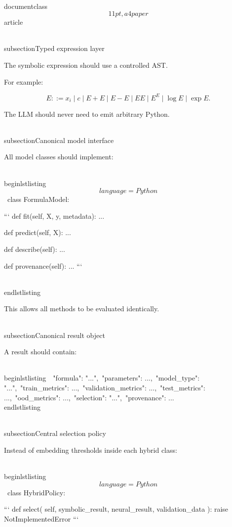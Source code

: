 \\documentclass\[11pt,a4paper\]{article}
\begin{document}
 \\subsection{Typed expression layer}

 The symbolic expression should use a controlled AST.

 For example:

 $$
E::=
x_i
\mid
c
\mid
E+E
\mid
E-E
\mid
E E
\mid
E^E
\mid
\log E
\mid
\exp E.
$$

 The LLM should never need to emit arbitrary Python.

 \\subsection{Canonical model interface}

 All model classes should implement:

 \\begin{lstlisting}\[language=Python\]\
 class FormulaModel:

```
def fit(self, X, y, metadata):
    ...

def predict(self, X):
    ...

def describe(self):
    ...

def provenance(self):
    ...
```

 \\end{lstlisting}

 This allows all methods to be evaluated identically.

 \\subsection{Canonical result object}

 A result should contain:

 \\begin{lstlisting}\
 {\
 "formula": "...",\
 "parameters": {...},\
 "model\_type": "...",\
 "train\_metrics": {...},\
 "validation\_metrics": {...},\
 "test\_metrics": {...},\
 "ood\_metrics": {...},\
 "selection": "...",\
 "provenance": {...}\
 }\
 \\end{lstlisting}

 \\subsection{Central selection policy}

 Instead of embedding thresholds inside each hybrid class:

 \\begin{lstlisting}\[language=Python\]\
 class HybridPolicy:

```
def select(
    self,
    symbolic_result,
    neural_result,
    validation_data
):
    raise NotImplementedError
```
\end{document}
